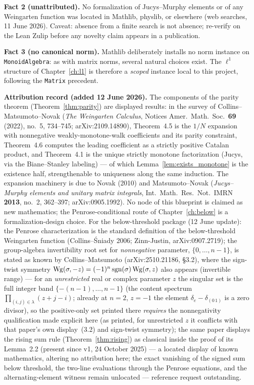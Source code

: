 \textbf{Fact 2 (unattributed).} No formalization of Jucys--Murphy
elements or of any Weingarten function was located in Mathlib, physlib, or
elsewhere (web searches, 11 June 2026). Caveat: absence from a finite
search is not absence; re-verify on the Lean Zulip before any novelty
claim appears in a publication.

\textbf{Fact 3 (no canonical norm).} Mathlib deliberately installs no norm
instance on \texttt{MonoidAlgebra}: as with matrix norms, several natural
choices exist. The $\ell^1$ structure of Chapter~\ref{ch:l1} is therefore
a \emph{scoped} instance local to this project, following the
\texttt{Matrix} precedent.

\textbf{Attribution record (added 12 June 2026).} The components of the
parity theorem (Theorem~\ref{thm:parity}) are displayed results: in the
survey of Collins--Matsumoto--Novak (\emph{The Weingarten Calculus},
Notices Amer.\ Math.\ Soc.\ \textbf{69} (2022), no.~5, 734--745;
arXiv:2109.14890), Theorem~4.5 is the $1/N$ expansion with nonnegative
weakly-monotone-walk coefficients and its parity constraint, Theorem~4.6
computes the leading coefficient as a strictly positive Catalan product,
and Theorem~4.1 is the unique strictly monotone factorization (Jucys, via
the Biane--Stanley labeling) --- of which Lemma~\ref{lem:exists_monotone}
is the existence half, strengthenable to uniqueness along the same
induction. The expansion machinery is due to Novak (2010) and
Matsumoto--Novak (\emph{Jucys--Murphy elements and unitary matrix
integrals}, Int.\ Math.\ Res.\ Not.\ IMRN \textbf{2013}, no.~2,
362--397; arXiv:0905.1992). No node of this blueprint is claimed as new
mathematics; the Penrose-conditional route of Chapter~\ref{ch:below} is a
formalization-design choice. For the below-threshold package (12 June
update): the Penrose characterization is the standard definition of the
below-threshold Weingarten function (Collins--\'Sniady 2006; Zinn-Justin,
arXiv:0907.2719); the group-algebra invertibility root set for \emph{nonnegative}
parameter, $\{0,\dots,n-1\}$, is stated as known by Collins--Matsumoto
(arXiv:2510.21186, \S3.2), where the sign-twist symmetry
$\operatorname{Wg}(\sigma,-z)=(-1)^n\operatorname{sgn}(\sigma)\operatorname{Wg}(\sigma,z)$ also appears (invertible
range) --- for an \emph{unrestricted} real or complex parameter $z$ the
singular set is the full integer band $\{-(n-1),\dots,n-1\}$ (the content
spectrum $\prod_{(i,j)\in\lambda}(z+j-i)$; already at $n=2$, $z=-1$ the
element $\delta_e-\delta_{(0\,1)}$ is a zero divisor), so the
positive-only set printed there \emph{requires} the nonnegativity
qualification made explicit here (as printed, for unrestricted $z$ it
conflicts with that paper's own display~(3.2) and sign-twist symmetry); the same paper displays the rising sum rule
(Theorem~\ref{thm:rising}) as classical inside the proof of its
Lemma~2.2 (present since v1, 24 October 2025) --- a located display of
known mathematics, altering no attribution here; the exact vanishing of
the signed sum below threshold, the
two-line evaluations through the Penrose equations, and the
alternating-element witness remain unlocated --- reference request
outstanding.

